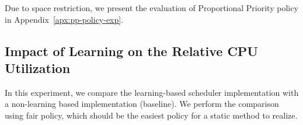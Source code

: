 Due to space restriction, we present the evaluation of Proportional Priority policy in Appendix~\ref{apx:pp-policy-exp}.
%
%
%
\subsection{Impact of Learning on the Relative CPU Utilization}\label{ssec:learning-impact-cpu-util}
In this experiment, we compare the learning-based scheduler implementation with a 
non-learning based implementation (baseline).
We perform the comparison using fair policy, which should be the easiest policy for a static method to realize.

